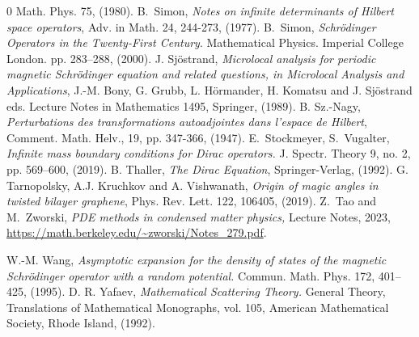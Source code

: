 \documentclass[reqno,12pt,letterpaper]{amsart}
\numberwithin{equation}{section}
\begin{document}
\begin{thebibliography}{0}
Math. Phys. 75, (1980). 
 B.~Simon, \emph{Notes on infinite determinants of Hilbert space operators}, Adv. in Math. 24, 244-273, (1977).
 B.~Simon, \emph{Schrödinger Operators in the Twenty-First Century}. Mathematical Physics. Imperial College London. pp. 283–288, (2000). 
 J. Sj\"ostrand, \emph{Microlocal analysis for periodic magnetic Schr\"odinger equation and related questions, in Microlocal Analysis and Applications}, J.-M. Bony, G. Grubb, L. H\"ormander, H. Komatsu and J. Sj\"ostrand eds. Lecture Notes in Mathematics 1495, Springer, (1989).
 B. Sz.-Nagy, \emph{Perturbations des transformations
autoadjointes dans l’espace de Hilbert}, Comment. Math. Helv., 19, pp. 347-366, (1947).
 E.~Stockmeyer, S.~Vugalter, \emph{Infinite mass boundary conditions for Dirac operators.} J. Spectr. Theory 9, no. 2, pp. 569–600, (2019).
 B. Thaller, \emph{The Dirac Equation}, Springer-Verlag, (1992). 
G. Tarnopolsky,  A.J. Kruchkov and A. Vishwanath,
\emph{Origin of magic angles in twisted bilayer graphene},
Phys. Rev. Lett. 122, 106405, (2019).
 Z.~Tao and M.~Zworski, 
{\em PDE methods in condensed matter physics,} Lecture Notes, 2023, \\ \url{https://math.berkeley.edu/~zworski/Notes_279.pdf}.

 W.-M. Wang, \emph{Asymptotic expansion for the density of states of the magnetic Schrödinger operator with a random potential.} Commun. Math. Phys. 172, 401--425, (1995).
 D. R. Yafaev, \emph{Mathematical Scattering Theory.} General Theory, Translations of Mathematical Monographs, vol. 105, American Mathematical Society, Rhode Island, (1992).  

\end{thebibliography}
\end{document}
